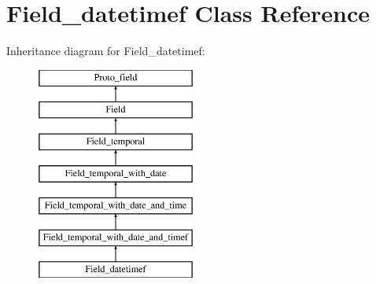 \hypertarget{classField__datetimef}{}\section{Field\+\_\+datetimef Class Reference}
\label{classField__datetimef}
Inheritance diagram for Field\+\_\+datetimef\+:\begin{figure}[H]
\begin{center}
\leavevmode
\includegraphics[height=7.000000cm]{classField__datetimef}
\end{center}
\end{figure}
